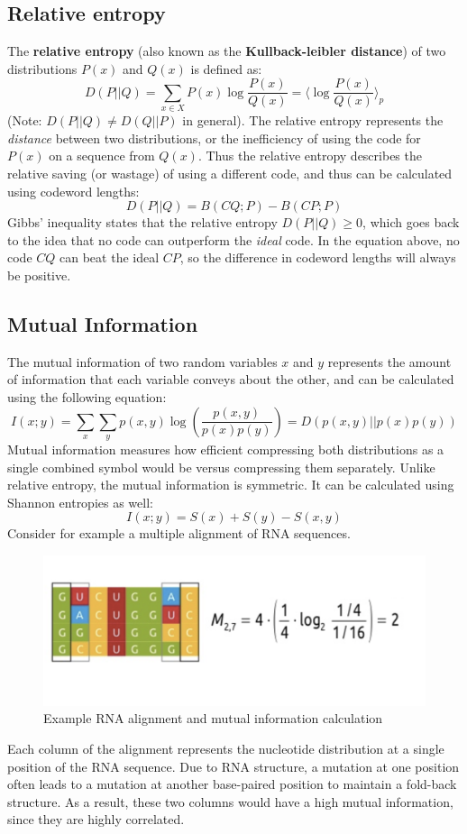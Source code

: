 \documentclass[12pt]{article}
\begin{document}
\subsection{Relative entropy}
The \textbf{relative entropy} (also known as the \textbf{Kullback-leibler distance}) of two distributions $P(x)$ and $Q(x)$ is defined as:
$$D(P||Q) = \sum_{x\in X}P(x)\log\frac{P(x)}{Q(x)} = \langle\log\frac{P(x)}{Q(x)}\rangle_p$$
(Note: $D(P||Q) \neq D(Q||P)$ in general). The relative entropy represents the \textit{distance} between two distributions, or the inefficiency of using the code for $P(x)$ on a sequence from $Q(x)$. Thus the relative entropy describes the relative saving (or wastage) of using a different code, and thus can be calculated using codeword lengths:
$$D(P||Q) = B(CQ;P) - B(CP;P)$$
Gibbs' inequality states that the relative entropy $D(P||Q) \geq 0$, which goes back to the idea that no code can outperform the \textit{ideal} code. In the equation above, no code $CQ$ can beat the ideal $CP$, so the difference in codeword lengths will always be positive.
\subsection{Mutual Information}
The mutual information of two random variables $x$ and $y$ represents the amount of information that each variable conveys about the other, and can be calculated using the following equation:
$$I(x;y) = \sum_x\sum_yp(x,y)\log\left(\frac{p(x,y)}{p(x)p(y)}\right) = D(p(x,y)||p(x)p(y))$$
Mutual information measures how efficient compressing both distributions as a single combined symbol would be versus compressing them separately. Unlike relative entropy, the mutual information is symmetric. It can be calculated using Shannon entropies as well:
$$I(x;y) = S(x) + S(y) - S(x,y)$$
Consider for example a multiple alignment of RNA sequences. 
\begin{figure}[h]
    \centering
    \includegraphics[width = .7\linewidth]{mutual.png}
    \caption{Example RNA alignment and mutual information calculation}
    \label{fig:mutual}
\end{figure}
Each column of the alignment represents the nucleotide distribution at a single position of the RNA sequence. Due to RNA structure, a mutation at one position often leads to a mutation at another base-paired position to maintain a fold-back structure. As a result, these two columns would have a high mutual information, since they are highly correlated.
\end{document}
